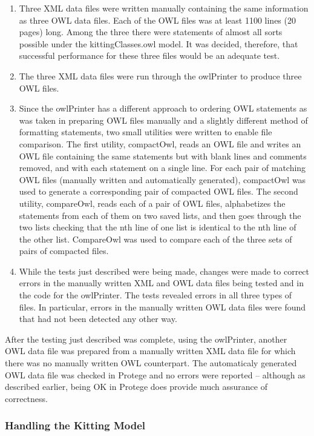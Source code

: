 \begin{enumerate}
\item Three XML data files were written manually containing the same
  information as three OWL data files. Each of the OWL files was at least
  1100 lines (20 pages) long. Among the three there were statements of
  almost all sorts possible under the kittingClasses.owl model. It was
  decided, therefore, that successful performance for these three files
  would be an adequate test.
\item The three XML data files were run through the owlPrinter to produce
  three OWL files.
\item Since the owlPrinter has a different approach to ordering OWL
  statements as was taken in preparing OWL files manually and a slightly
  different method of formatting statements, two small utilities were
  written to enable file comparison. The first utility, compactOwl, reads
  an OWL file and writes an OWL file containing the same statements but
  with blank lines and comments removed, and with each statement on a
  single line. For each pair of matching OWL files (manually written and
  automatically generated), compactOwl was used to generate a corresponding
  pair of compacted OWL files. The second utility, compareOwl, reads each
  of a pair of OWL files, alphabetizes the statements from each of them on
  two saved lists, and then goes through the two lists checking that the
  nth line of one list is identical to the nth line of the other list.
  CompareOwl was used to compare each of the three sets of pairs of
  compacted files.
\item While the tests just described were being made, changes were made to
  correct errors in the manually written XML and OWL data files being
  tested and in the code for the owlPrinter. The tests revealed errors in
  all three types of files. In particular, errors in the manually written
  OWL data files were found that had not been detected any other way.
\end{enumerate}

After the testing just described was complete, using the owlPrinter,
another OWL data file was prepared from a manually written XML data file
for which there was no manually written OWL counterpart. The automaticaly
generated OWL data file was checked in Protege and no errors were reported
-- although as described earlier, being OK in Protege does provide much
assurance of correctness.\\

\subsubsection{Handling the Kitting Model}

